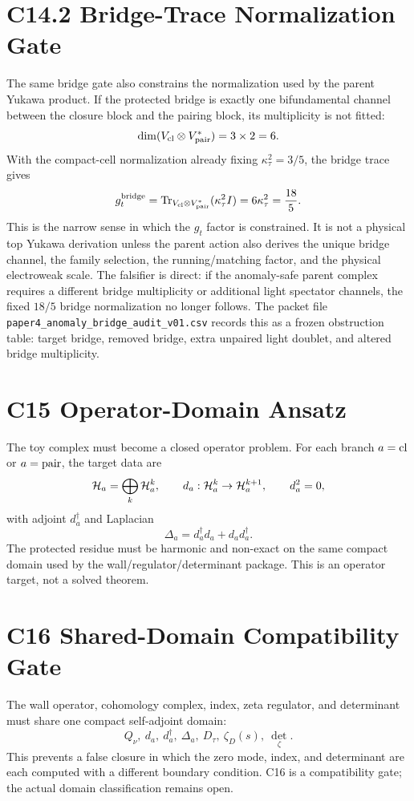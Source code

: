 \documentclass[11pt]{article}
\begin{document}
\section{C14.2 Bridge-Trace Normalization Gate}
The same bridge gate also constrains the normalization used by the parent
Yukawa product.  If the protected bridge is exactly one bifundamental channel
between the closure block and the pairing block, its multiplicity is not fitted:
\begin{equation}
\dim(V_{\rm cl}\otimes V_{\rm pair}^*)=3\times2=6 .
\end{equation}
With the compact-cell normalization already fixing
$\kappa_\tau^2=3/5$, the bridge trace gives
\begin{equation}
g_t^{\rm bridge}
=\operatorname{Tr}_{V_{\rm cl}\otimes V_{\rm pair}^*}
(\kappa_\tau^2 I)
=6\kappa_\tau^2=\frac{18}{5} .
\end{equation}
This is the narrow sense in which the $g_t$ factor is constrained.  It is not a
physical top Yukawa derivation unless the parent action also derives the unique
bridge channel, the family selection, the running/matching factor, and the
physical electroweak scale.  The falsifier is direct: if the anomaly-safe
parent complex requires a different bridge multiplicity or additional light
spectator channels, the fixed $18/5$ bridge normalization no longer follows.
The packet file \texttt{paper4\_anomaly\_bridge\_audit\_v01.csv} records this
as a frozen obstruction table: target bridge, removed bridge, extra unpaired
light doublet, and altered bridge multiplicity.

\section{C15 Operator-Domain Ansatz}
The toy complex must become a closed operator problem.  For each branch
$a={\rm cl}$ or $a={\rm pair}$, the target data are
\begin{equation}
{\cal H}_a=\bigoplus_k{\cal H}^k_a,\qquad
d_a:{\cal H}^k_a\to{\cal H}^{k+1}_a,\qquad d_a^2=0,
\end{equation}
with adjoint $d_a^\dagger$ and Laplacian
\begin{equation}
\Delta_a=d_a^\dagger d_a+d_a d_a^\dagger .
\end{equation}
The protected residue must be harmonic and non-exact on the same compact
domain used by the wall/regulator/determinant package.  This is an operator
target, not a solved theorem.

\section{C16 Shared-Domain Compatibility Gate}
The wall operator, cohomology complex, index, zeta regulator, and determinant
must share one compact self-adjoint domain:
\begin{equation}
Q_\nu,\ d_a,\ d_a^\dagger,\ \Delta_a,\ D_\tau,\ \zeta_D(s),\ \det_\zeta .
\end{equation}
This prevents a false closure in which the zero mode, index, and determinant
are each computed with a different boundary condition.  C16 is a compatibility
gate; the actual domain classification remains open.
\end{document}
